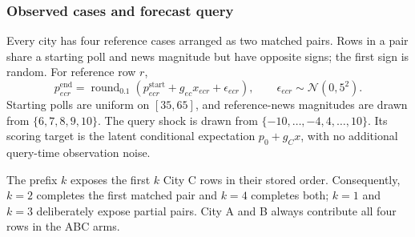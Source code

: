 \subsubsection{Observed cases and forecast query}
Every city has four reference cases arranged as two matched pairs. Rows in a pair
share a starting poll and news magnitude but have opposite signs; the first sign is
random. For reference row \(r\),
\[
  p^{\mathrm{end}}_{ecr}
    = \operatorname{round}_{0.1}
      \left(p^{\mathrm{start}}_{ecr}+g_{ec}x_{ecr}
      +\epsilon_{ecr}\right),
  \qquad \epsilon_{ecr}\sim\mathcal N(0,5^2).
\]
Starting polls are uniform on \([35,65]\), and reference-news magnitudes are drawn
from \(\{6,7,8,9,10\}\). The query shock is drawn from
\(\{-10,\ldots,-4,4,\ldots,10\}\). Its scoring target is the latent conditional
expectation \(p_0+g_Cx\), with no additional query-time observation noise.

The prefix \(k\) exposes the first \(k\) City C rows in their stored order.
Consequently, \(k=2\) completes the first matched pair and \(k=4\) completes both;
\(k=1\) and \(k=3\) deliberately expose partial pairs. City A and B always
contribute all four rows in the ABC arms.

